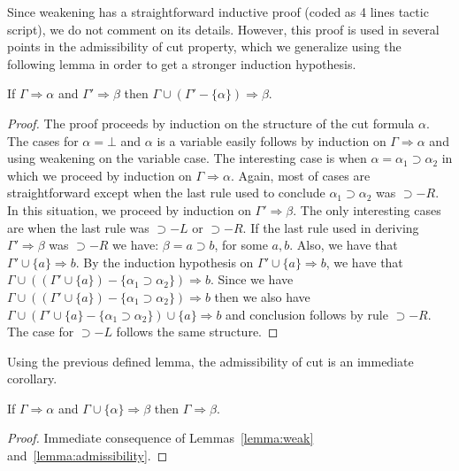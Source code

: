 Since weakening has a straightforward inductive proof (coded as 4 lines tactic script),
we do not comment on its details. However, this proof is used in several points in the admissibility
of cut property, which we generalize using the following lemma in order to get a stronger induction hypothesis.



\begin{Lemma}\label{lemma:admissibility}
   If $\Gamma\Rightarrow\alpha$ and $\Gamma'\Rightarrow \beta$ then $\Gamma \cup (\Gamma' - \{\alpha\}) \Rightarrow \beta$.
\end{Lemma}
\begin{proof}
   The proof proceeds by induction on the structure of the cut formula $\alpha$. The cases for $\alpha = \bot$ and
   $\alpha$ is a variable easily follows by induction on  $\Gamma\Rightarrow\alpha$ and using weakening on the variable case.
   The interesting case is when $\alpha = \alpha_1 \supset \alpha_2$ in which we proceed by induction on $\Gamma\Rightarrow\alpha$.
   Again, most of cases are straightforward except when the last rule used to conclude $\alpha_1\supset\alpha_2$ was $\supset-R$.
   In this situation, we proceed by induction on $\Gamma'\Rightarrow \beta$. The only interesting cases are when the last rule was
   $\supset-L$ or $\supset-R$. If the last rule used in deriving $\Gamma' \Rightarrow \beta$ was
   $\supset-R$ we have: $\beta = a \supset b$, for some $a,b$.
   Also, we have that $\Gamma' \cup \{a\}\Rightarrow b$. By the
   induction hypothesis on $\Gamma' \cup \{a\}\Rightarrow b$, we
   have that $\Gamma \cup ((\Gamma' \cup \{a\}) - \{\alpha_1 \supset \alpha_2\})\Rightarrow b$. Since we have 
   $\Gamma \cup ((\Gamma' \cup \{a\}) - \{\alpha_1 \supset \alpha_2\})\Rightarrow b$ then we also have
   $\Gamma \cup (\Gamma' \cup \{a\} - \{\alpha_1 \supset \alpha_2\}) \cup \{a\} \Rightarrow b$ and conclusion follows by rule
   $\supset-R$. The case for $\supset-L$ follows the same structure.
\end{proof}

Using the previous defined lemma, the admissibility of cut is an immediate corollary.



\begin{Corollary}
  If $\Gamma \Rightarrow \alpha$ and $\Gamma \cup\{\alpha\}\Rightarrow \beta$
  then $\Gamma \Rightarrow \beta$.
\end{Corollary}
\begin{proof}
  Immediate consequence of Lemmas~\ref{lemma:weak} and~\ref{lemma:admissibility}.
\end{proof}



